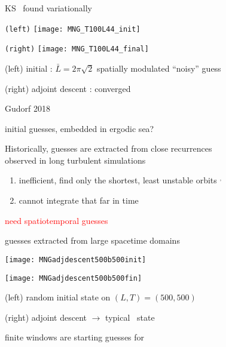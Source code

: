 \begin{frame}{KS \twot\ found variationally}
\begin{minipage}[height=.72\textheight]{.40\textwidth}
\centering \small{\texttt{(left)}}
\texttt{[image: MNG\_T100L44\_init]}
\end{minipage}
\begin{minipage}[height=.72\textheight]{.40\textwidth}
\centering \small{\texttt{(right)}}
\texttt{[image: MNG\_T100L44\_final]}
\end{minipage}

\vfill
(left) initial : $\bar{L}=2\pi\sqrt{2}$ spatially modulated ``noisy'' guess

(right) adjoint descent : converged \twot\

\vfill\hfill        Gudorf 2018
\end{frame}

\begin{frame}{initial guesses, embedded in ergodic sea?}
\begin{block}{Historically, }
guesses are extracted from close recurrences \\
observed in long turbulent simulations
\end{block}
\bigskip\bigskip
            \begin{enumerate}
              \item
inefficient, find only the shortest, least unstable orbits%
$^,$
              \item
cannot integrate that far in time
            \end{enumerate}

\vfill\hfill\textcolor{red}{\huge need spatiotemporal guesses}
\end{frame}

\begin{frame}{guesses extracted from large spacetime domains}
\begin{minipage}[height=.45\textwidth]{.45\textwidth}
\centering %
\texttt{[image: MNGadjdescent500b500init]}
\end{minipage}
\begin{minipage}[height=.45\textwidth]{.45\textwidth}
\centering %
\texttt{[image: MNGadjdescent500b500fin]}
\end{minipage}

(left) random initial state on
$(L,T)=(500,500)$

(right) adjoint descent $\to$ typical \KS\ state

\vfill\hfill
finite windows are starting guesses for \twots
\end{frame}

